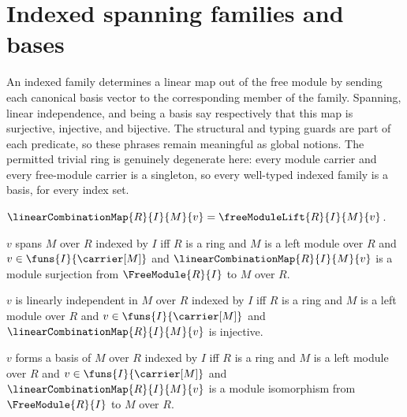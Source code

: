 



\section{Indexed spanning families and bases}

An indexed family determines a linear map out of the free module by sending
each canonical basis vector to the corresponding member of the family.
Spanning, linear independence, and being a basis say respectively that this
map is surjective, injective, and bijective.  The structural and typing guards
are part of each predicate, so these phrases remain meaningful as global
notions.  The permitted trivial ring is genuinely degenerate here: every
module carrier and every free-module carrier is a singleton, so every
well-typed indexed family is a basis, for every index set.

\begin{definition}\label{linear_combination_map}
    $\linearCombinationMap{R}{I}{M}{v}
        =\freeModuleLift{R}{I}{M}{v}$.
\end{definition}

\begin{definition}\label{indexed_module_spanning}
    $v$ spans $M$ over $R$ indexed by $I$ iff
        $R$ is a ring and $M$ is a left module over $R$ and
        $v\in\funs{I}{\carrier[M]}$ and
        $\linearCombinationMap{R}{I}{M}{v}$ is a module surjection from
            $\FreeModule{R}{I}$ to $M$ over $R$.
\end{definition}

\begin{definition}\label{indexed_module_linear_independence}
    $v$ is linearly independent in $M$ over $R$ indexed by $I$ iff
        $R$ is a ring and $M$ is a left module over $R$ and
        $v\in\funs{I}{\carrier[M]}$ and
        $\linearCombinationMap{R}{I}{M}{v}$ is injective.
\end{definition}

\begin{definition}\label{indexed_module_basis}
    $v$ forms a basis of $M$ over $R$ indexed by $I$ iff
        $R$ is a ring and $M$ is a left module over $R$ and
        $v\in\funs{I}{\carrier[M]}$ and
        $\linearCombinationMap{R}{I}{M}{v}$ is a module isomorphism from
            $\FreeModule{R}{I}$ to $M$ over $R$.
\end{definition}


